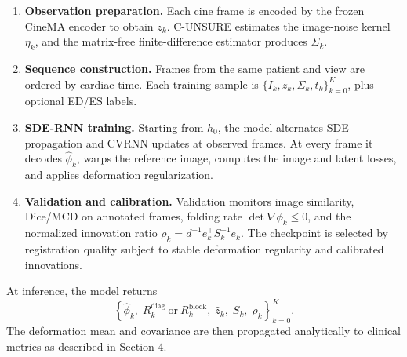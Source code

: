 \begin{enumerate}
    \item \textbf{Observation preparation.}
    Each cine frame is encoded by the frozen CineMA encoder to obtain
    $z_k$. C-UNSURE estimates the image-noise kernel $\eta_k$, and the
    matrix-free finite-difference estimator produces $\Sigma_k$.

    \item \textbf{Sequence construction.}
    Frames from the same patient and view are ordered by cardiac time.
    Each training sample is
    $\{I_k,z_k,\Sigma_k,t_k\}_{k=0}^{K}$, plus optional ED/ES labels.

    \item \textbf{SDE-RNN training.}
    Starting from $h_0$, the model alternates SDE propagation and CVRNN
    updates at observed frames. At every frame it decodes
    $\widehat\phi_k$, warps the reference image, computes the image and
    latent losses, and applies deformation regularization.

    \item \textbf{Validation and calibration.}
    Validation monitors image similarity, Dice/MCD on annotated frames,
    folding rate $\det\nabla\phi_k\leq0$, and the normalized innovation
    ratio $\rho_k=d^{-1}e_k^\top S_k^{-1}e_k$. The checkpoint is selected
    by registration quality subject to stable deformation regularity and
    calibrated innovations.
\end{enumerate}

At inference, the model returns
\[
    \left\{
    \widehat\phi_k,\;
    R_k^{\mathrm{diag}}\ \mathrm{or}\ R_k^{\mathrm{block}},\;
    \widehat z_k,\;
    S_k,\;
    \bar\rho_k
    \right\}_{k=0}^{K}.
\]
The deformation mean and covariance are then propagated analytically to
clinical metrics as described in Section 4.
